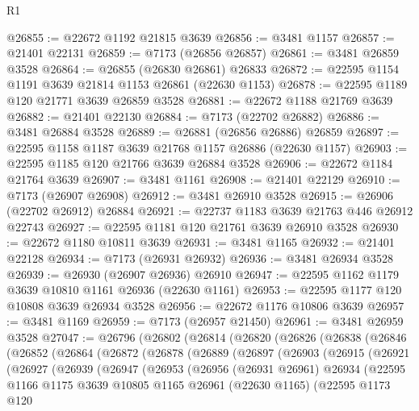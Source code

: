 \begin{lexlean}{R1}
\begin{coremodule}
@26855 := @22672 @1192 @21815 @3639
@26856 := @3481 @1157
@26857 := @21401 @22131
@26859 := @7173 (@26856 @26857)
@26861 := @3481 @26859 @3528
@26864 := @26855 (@26830 @26861) @26833
@26872 := @22595 @1154 @1191 @3639 @21814 @1153 @26861 (@22630 @1153)
@26878 := @22595 @1189 @120 @21771 @3639 @26859 @3528
@26881 := @22672 @1188 @21769 @3639
@26882 := @21401 @22130
@26884 := @7173 (@22702 @26882)
@26886 := @3481 @26884 @3528
@26889 := @26881 (@26856 @26886) @26859
@26897 := @22595 @1158 @1187 @3639 @21768 @1157 @26886 (@22630 @1157)
@26903 := @22595 @1185 @120 @21766 @3639 @26884 @3528
@26906 := @22672 @1184 @21764 @3639
@26907 := @3481 @1161
@26908 := @21401 @22129
@26910 := @7173 (@26907 @26908)
@26912 := @3481 @26910 @3528
@26915 := @26906 (@22702 @26912) @26884
@26921 := @22737 @1183 @3639 @21763 @446 @26912 @22743
@26927 := @22595 @1181 @120 @21761 @3639 @26910 @3528
@26930 := @22672 @1180 @10811 @3639
@26931 := @3481 @1165
@26932 := @21401 @22128
@26934 := @7173 (@26931 @26932)
@26936 := @3481 @26934 @3528
@26939 := @26930 (@26907 @26936) @26910
@26947 := @22595 @1162 @1179 @3639 @10810 @1161 @26936 (@22630 @1161)
@26953 := @22595 @1177 @120 @10808 @3639 @26934 @3528
@26956 := @22672 @1176 @10806 @3639
@26957 := @3481 @1169
@26959 := @7173 (@26957 @21450)
@26961 := @3481 @26959 @3528
@27047 := @26796
    (@26802
      (@26814
        (@26820
          (@26826
            (@26838
              (@26846
                (@26852
                  (@26864
                    (@26872
                      (@26878
                        (@26889
                          (@26897
                            (@26903
                              (@26915
                                (@26921
                                  (@26927
                                    (@26939
                                      (@26947
                                        (@26953
                                          (@26956
                                            (@26931 @26961)
                                            @26934
                                            (@22595
                                              @1166
                                              @1175
                                              @3639
                                              @10805
                                              @1165
                                              @26961
                                              (@22630 @1165)
                                              (@22595
                                                @1173
                                                @120

\end{coremodule}
\end{lexlean}
